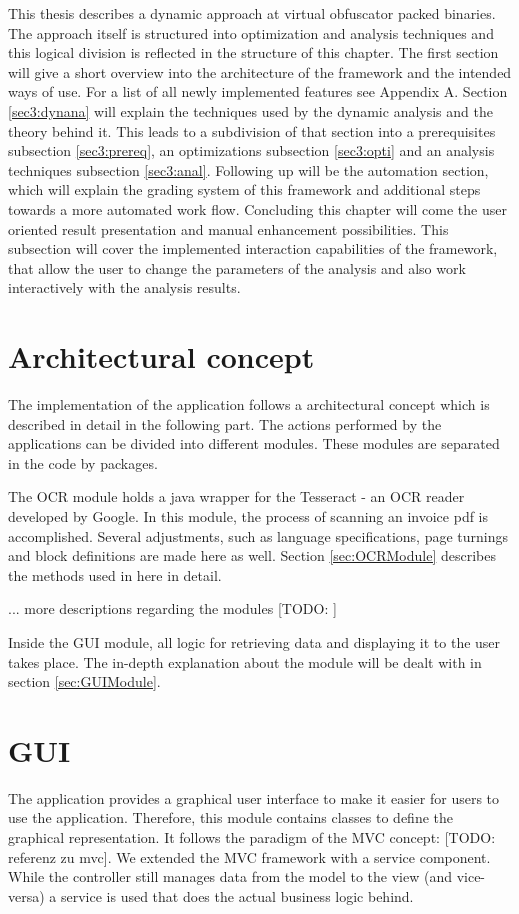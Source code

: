 \documentclass[10pt,twoside,a4paper,bibliography=totoc]{scrbook}
\newcommand{\todo}[1]{{\color{magenta} [TODO: #1]}}
\begin{document}
This thesis describes a dynamic approach at virtual obfuscator packed binaries. The approach itself is structured into optimization and analysis techniques and this logical division is reflected in the structure of this chapter.
The first section will give a short overview into the architecture of the framework and the intended ways of use. For a list of all newly implemented features see Appendix A.
Section \ref{sec3:dynana} will explain the techniques used by the dynamic analysis and the theory behind it. This leads to a subdivision of that section into a prerequisites subsection \ref{sec3:prereq}, an optimizations subsection \ref{sec3:opti} and an analysis techniques subsection \ref{sec3:anal}.
Following up will be the automation section, which will explain the grading system of this framework and additional steps towards a more automated work flow.
Concluding this chapter will come the user oriented result presentation and manual enhancement possibilities. This subsection will cover the implemented interaction capabilities of the framework, that allow the user to change the parameters of the analysis and also work interactively with the analysis results.
 
\section{Architectural concept}
The implementation of the application follows a architectural concept which is described in detail in the following part. The actions performed by the applications can be divided into different modules. These modules are separated in the code by packages.

The OCR module holds a java wrapper for the Tesseract - an OCR reader developed by Google. In this module, the process of scanning an invoice pdf is accomplished. Several adjustments, such as language specifications, page turnings and block definitions are made here as well. Section \ref{sec:OCRModule} describes the methods used in here in detail.

...
more descriptions regarding the modules 
\todo{}

Inside the GUI module, all logic for retrieving data and displaying it to the user takes place. The in-depth explanation about the module will be dealt with in section \ref{sec:GUIModule}.

\section{GUI}
\label{GUIModule}
The application provides a graphical user interface to make it easier for users to use the application. Therefore, this module contains classes to define the graphical representation. It follows the paradigm of the MVC concept: \todo{referenz zu mvc}. We extended the MVC framework with a service component. While the controller still manages data from the model to the view (and vice-versa) a service is used that does the actual business logic behind.
\end{document}
